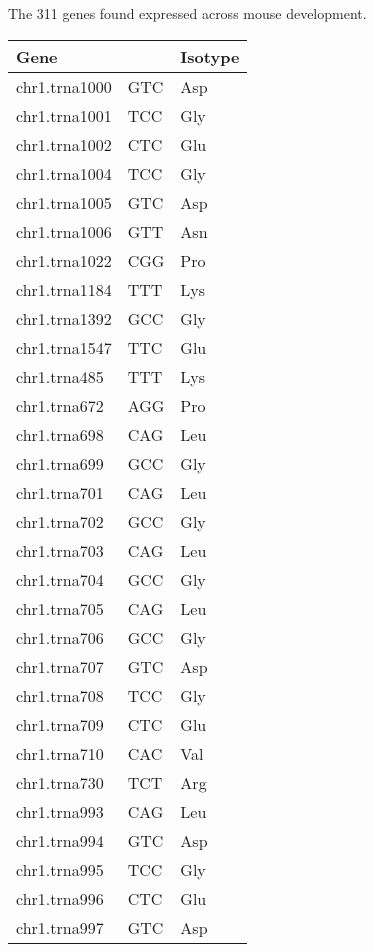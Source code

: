     {The \num{311}  genes found expressed across mouse development.}{}

\begin{longtable}{@{}l>{\collectcell\anticodon}l<{\endcollectcell}l@{}}
    \toprule
    Gene & \multicolumn{1}{l}{Isoacceptor} & Isotype \\
    \midrule
    \endhead
    chr1.trna1000 & GTC & Asp \\
    chr1.trna1001 & TCC & Gly \\
    chr1.trna1002 & CTC & Glu \\
    chr1.trna1004 & TCC & Gly \\
    chr1.trna1005 & GTC & Asp \\
    chr1.trna1006 & GTT & Asn \\
    chr1.trna1022 & CGG & Pro \\
    chr1.trna1184 & TTT & Lys \\
    chr1.trna1392 & GCC & Gly \\
    chr1.trna1547 & TTC & Glu \\
    chr1.trna485 & TTT & Lys \\
    chr1.trna672 & AGG & Pro \\
    chr1.trna698 & CAG & Leu \\
    chr1.trna699 & GCC & Gly \\
    chr1.trna701 & CAG & Leu \\
    chr1.trna702 & GCC & Gly \\
    chr1.trna703 & CAG & Leu \\
    chr1.trna704 & GCC & Gly \\
    chr1.trna705 & CAG & Leu \\
    chr1.trna706 & GCC & Gly \\
    chr1.trna707 & GTC & Asp \\
    chr1.trna708 & TCC & Gly \\
    chr1.trna709 & CTC & Glu \\
    chr1.trna710 & CAC & Val \\
    chr1.trna730 & TCT & Arg \\
    chr1.trna993 & CAG & Leu \\
    chr1.trna994 & GTC & Asp \\
    chr1.trna995 & TCC & Gly \\
    chr1.trna996 & CTC & Glu \\
    chr1.trna997 & GTC & Asp \\

\end{longtable}
